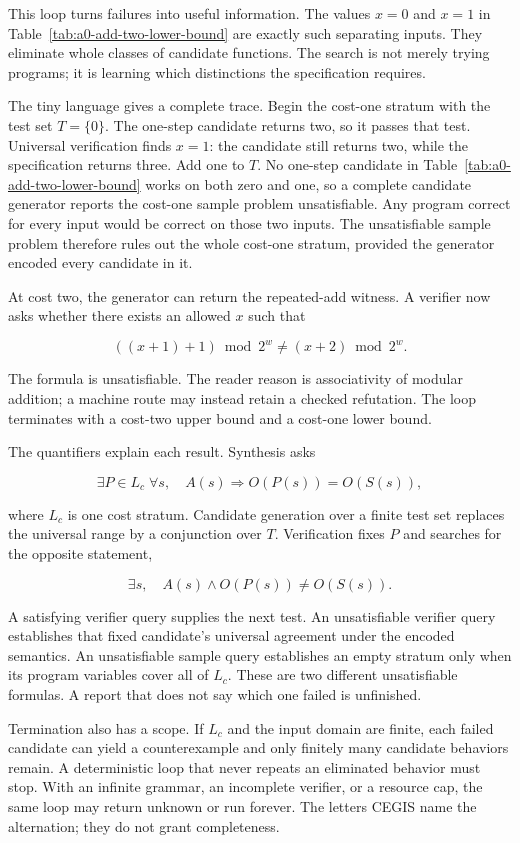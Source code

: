This loop turns failures into useful information. The values \(x=0\) and
\(x=1\) in Table~\ref{tab:a0-add-two-lower-bound} are exactly such separating
inputs. They eliminate whole classes of candidate functions. The search is
not merely trying programs; it is learning which distinctions the
specification requires.

The tiny language gives a complete trace. Begin the cost-one stratum with the
test set \(T=\{0\}\). The one-step candidate
 returns two, so it passes that test. Universal verification
finds \(x=1\): the candidate still returns two, while the specification returns
three. Add one to \(T\). No one-step candidate in
Table~\ref{tab:a0-add-two-lower-bound} works on both zero and one, so a complete
candidate generator reports the cost-one sample problem unsatisfiable. Any
program correct for every input would be correct on those two inputs. The
unsatisfiable sample problem therefore rules out the whole cost-one stratum,
provided the generator encoded every candidate in it.

At cost two, the generator can return the repeated-add witness. A verifier now
asks whether there exists an allowed \(x\) such that

\[
  ((x+1)+1)\bmod 2^w\ne(x+2)\bmod 2^w.
\]

The formula is unsatisfiable. The reader reason is associativity of modular
addition; a machine route may instead retain a checked refutation. The loop
terminates with a cost-two upper bound and a cost-one lower bound.

The quantifiers explain each result. Synthesis asks

\[
  \exists P\in L_c\;\forall s,\quad
  A(s)\Longrightarrow O(P(s))=O(S(s)),
\]

where \(L_c\) is one cost stratum. Candidate generation over a finite test set
replaces the universal range by a conjunction over \(T\). Verification fixes
\(P\) and searches for the opposite statement,

\[
  \exists s,\quad A(s)\land O(P(s))\ne O(S(s)).
\]

A satisfying verifier query supplies the next test. An unsatisfiable verifier
query establishes that fixed candidate's universal agreement under the
encoded semantics. An unsatisfiable sample query establishes an empty stratum
only when its program variables cover all of \(L_c\). These are two different
unsatisfiable formulas. A report that does not say which one failed is
unfinished.

Termination also has a scope. If \(L_c\) and the input domain are finite, each
failed candidate can yield a counterexample and only finitely many candidate
behaviors remain. A deterministic loop that never repeats an eliminated
behavior must stop. With an infinite grammar, an incomplete verifier, or a
resource cap, the same loop may return unknown or run forever. The letters
CEGIS name the alternation; they do not grant completeness.

